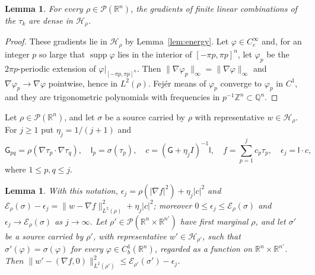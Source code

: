 \documentclass[11pt]{amsart}
\numberwithin{equation}{section}
\theoremstyle{plain}
\newtheorem{lemma}[theorem]{Lemma}
\theoremstyle{remark}
\newcommand{\R}{\mathbb{R}}
\newcommand{\Q}{\mathbb{Q}}
\newcommand{\cP}{\mathcal{P}}
\newcommand{\cE}{\mathcal{E}}
\newcommand{\cH}{\mathcal{H}}
\begin{document}
\begin{lemma}\label{lem:trig-dense}
For every $\rho\in\cP(\R^n)$, the gradients of finite linear combinations of the $\tau_k$ are dense in $\cH_\rho$.
\end{lemma}

\begin{proof}
These gradients lie in $\cH_\rho$ by Lemma~\ref{lem:energy}. Let $\varphi\in C^\infty_c$ and, for an integer $p$ so large that $\operatorname{supp}\varphi$ lies in the interior of $[-\pi p,\pi p]^n$, let $\varphi_p$ be the $2\pi p$-periodic extension of $\varphi|_{[-\pi p,\pi p]^n}$. Then $\|\nabla\varphi_p\|_\infty=\|\nabla\varphi\|_\infty$ and $\nabla\varphi_p\to\nabla\varphi$ pointwise, hence in $L^2(\rho)$. Fej\'er means of $\varphi_p$ converge to $\varphi_p$ in $C^1$, and they are trigonometric polynomials with frequencies in $p^{-1}\mathbb Z^n\subset\Q^n$.
\end{proof}

Let $\rho\in\cP(\R^n)$, and let $\sigma$ be a source carried by $\rho$ with representative $w\in\cH_\rho$. For $j\ge1$ put $\eta_j=1/(j+1)$ and
\begin{equation}\label{eq:galerkin}
\mathsf G_{pq}=\rho(\nabla\tau_p\cdot\nabla\tau_q),\quad \mathsf l_p=\sigma(\tau_p),\quad c=(\mathsf G+\eta_jI)^{-1}\mathsf l,\quad f=\sum_{p=1}^jc_p\tau_p,\quad \epsilon_j=\mathsf l\cdot c,
\end{equation}
where $1\le p,q\le j$.

\begin{lemma}\label{lem:galerkin}
With this notation, $\epsilon_j=\rho(|\nabla f|^2)+\eta_j|c|^2$ and $\cE_\rho(\sigma)-\epsilon_j=\|w-\nabla f\|^2_{L^2(\rho)}+\eta_j|c|^2$; moreover $0\le\epsilon_j\le\cE_\rho(\sigma)$ and $\epsilon_j\to\cE_\rho(\sigma)$ as $j\to\infty$. Let $\rho'\in\cP(\R^n\times\R^{n'})$ have first marginal $\rho$, and let $\sigma'$ be a source carried by $\rho'$, with representative $w'\in\cH_{\rho'}$, such that $\sigma'(\varphi)=\sigma(\varphi)$ for every $\varphi\in C^1_b(\R^n)$, regarded as a function on $\R^n\times\R^{n'}$. Then $\|w'-(\nabla f,0)\|^2_{L^2(\rho')}\le\cE_{\rho'}(\sigma')-\epsilon_j$.
\end{lemma}
\end{document}
